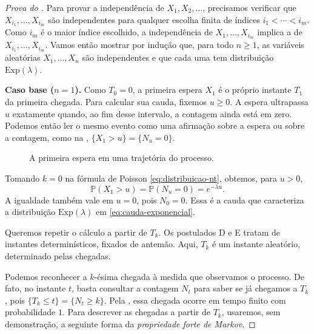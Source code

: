 \documentclass[12pt,portuguese]{article}
\theoremstyle{definition}
\theoremstyle{plainexercise}
\theoremstyle{starredexercise}
\theoremstyle{definition}
\begin{document}
\begin{proof}[Prova do ]
Para provar a independência de $X_1,X_2,\ldots$, precisamos verificar que
$X_{i_1},\ldots,X_{i_m}$ são independentes para qualquer escolha finita de
índices $i_1<\cdots<i_m$. Como $i_m$ é o maior índice escolhido, a
independência de $X_1,\ldots,X_{i_m}$ implica a de $X_{i_1},\ldots,X_{i_m}$.
Vamos então mostrar por indução que, para todo $n\geqslant 1$, as variáveis
aleatórias $X_1,\ldots,X_n$ são independentes e que cada uma tem distribuição
$\mathrm{Exp}(\lambda)$.

\smallskip
\noindent\textbf{Caso base ($n=1$).}
Como $T_0=0$, a primeira espera $X_1$ é o próprio instante $T_1$ da primeira
chegada. Para calcular sua cauda, fixemos $u\geqslant 0$. A espera ultrapassa
$u$ exatamente quando, ao fim desse intervalo, a contagem ainda está em zero.
Podemos então ler o mesmo evento como uma afirmação sobre a espera ou sobre
a contagem, como na ,
$\{X_1>u\}=\{N_u=0\}$.
\begin{figure}[H]
  \centering
  \caption{A primeira espera em uma trajetória do processo.}
  \label{fig:primeira-espera-poisson}
\end{figure}

Tomando $k=0$ na fórmula de Poisson \eqref{eq:distribuicao-nt}, obtemos, para
$u>0$,
\[
  \mathbb{P}(X_1>u)=\mathbb{P}(N_u=0)=e^{-\lambda u}.
\]
A igualdade também vale em $u=0$, pois $N_0=0$. Essa é a cauda que
caracteriza a distribuição $\mathrm{Exp}(\lambda)$ em
\eqref{eq:cauda-exponencial}.

Queremos repetir o cálculo a partir de $T_k$. Os postulados D e E tratam de
instantes determinísticos, fixados de antemão. Aqui, $T_k$ é um instante
aleatório, determinado pelas chegadas.

Podemos reconhecer a $k$-ésima chegada à medida que observamos o
processo. De fato, no instante $t$, basta consultar a contagem $N_t$
para saber se já chegamos a $T_k$, pois
\mbox{$\{T_k\leqslant t\}=\{N_t\geqslant k\}$}. Pela
, essa chegada ocorre em tempo finito com
probabilidade $1$. Para descrever as chegadas a partir de $T_k$,
usaremos, sem demonstração, a seguinte forma da
\emph{propriedade forte de Markov}.


\end{proof}
\end{document}
